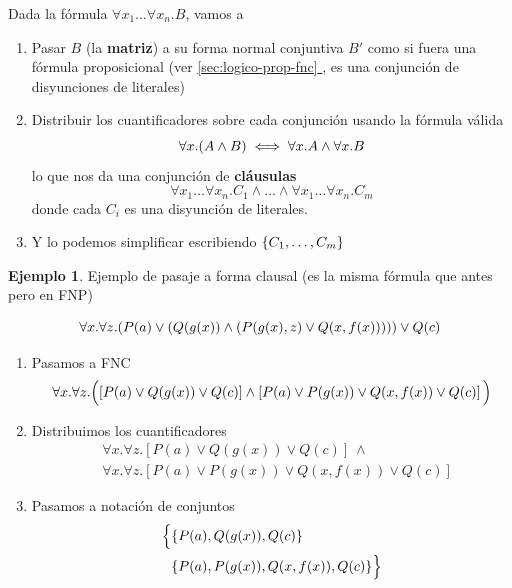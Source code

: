 \documentclass{report}
\newcommand*{\fullref}[1]{\hyperref[{#1}]{\autoref*{#1} \nameref*{#1}}}
\theoremstyle{definition} %
\newtheorem*{example*}{Ejemplo}
\begin{document}
Dada la fórmula $\forall x_1 \dots \forall x_n . B$, vamos a

\begin{enumerate}
    \item Pasar $B$ (la \textbf{matriz}) a su forma normal conjuntiva $B'$ como
    si fuera una fórmula proposicional (ver \fullref{sec:logico-prop-fnc}, es
    una conjunción de disyunciones de literales)
    \item Distribuir los cuantificadores sobre cada conjunción usando la fórmula
    válida
    \[
        \forall x . (A \wedge B) \iff \forall x . A \wedge \forall x . B
    \]
    lo que nos da una conjunción de \textbf{cláusulas}
    \[
        \forall x_1\dots \forall x_n .C_1 \wedge \dots \wedge
        \forall x_1\dots \forall x_n .C_m
    \]
    donde cada $C_i$ es una disyunción de literales.
    \item Y lo podemos simplificar escribiendo $\{ C_1, \dots, C_m \}$
\end{enumerate}

\begin{example*}
    Ejemplo de pasaje a forma clausal (es la misma fórmula que antes pero en
    FNP)

    \[
    \por
    {
        \paratodo{x}{
            \paratodo{z}{(
                \por{P(a)}{(
                    \y{Q(g(x))}{(
                        \por{P(g(x), z)}{Q(x, f(x))}
                    )}
                )}
            )}
        }
    }{Q(c)}
    \]

    \begin{enumerate}
        \item Pasamos a FNC
        \[
            \forall x . \forall z . \Big(
                [P(a) \vee Q(g(x)) \vee Q(c)] \wedge
                \left[P(a) \vee P(g(x)) \vee Q(x, f(x)) \vee Q(c)\right]
            \Big)
        \]
        \item Distribuimos los cuantificadores
        \begin{align*}
            &\forall x. \forall z.[P(a) \vee Q(g(x)) \vee Q(c)]\ \wedge\\
            &\forall x. \forall z.[P(a) \vee P(g(x)) \vee Q(x, f(x)) \vee Q(c)]
        \end{align*}
        \item Pasamos a notación de conjuntos
        \begin{align*}
            \Big\{
            &\{ P(a), Q(g(x)), Q(c) \}\\
            &\{ P(a), P(g(x)), Q(x, f(x)), Q(c) \}
            \Big\}
        \end{align*}
    \end{enumerate}
\end{example*}
\end{document}
